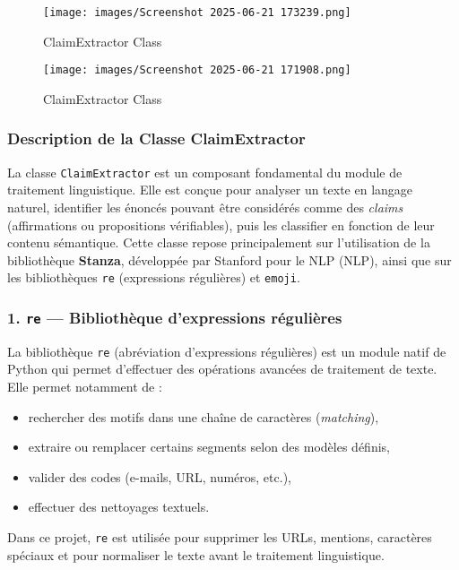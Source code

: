 \begin{description}
\begin{description}
\begin{description}
\begin{itemize}
\begin{figure}
\end{figure}

\begin{figure}
    \centering
    \texttt{[image: images/Screenshot 2025-06-21 173239.png]} 
    \caption{ClaimExtractor Class} %
    \label{fig:logos} %
\end{figure}
\newpage

\begin{figure}
  
    \texttt{[image: images/Screenshot 2025-06-21 171908.png]} 
    \caption{ClaimExtractor Class} %
    \label{fig:logos} %
\end{figure}
\vspace{-0.5cm}
\subsubsection{Description de la Classe ClaimExtractor}
La classe \texttt{ClaimExtractor} est un composant fondamental du module de traitement linguistique. Elle est conçue pour analyser un texte en langage naturel, identifier les énoncés pouvant être considérés comme des \textit{claims} (affirmations ou propositions vérifiables), puis les classifier en fonction de leur contenu sémantique. Cette classe repose principalement sur l'utilisation de la bibliothèque \textbf{Stanza}, développée par Stanford pour le NLP (NLP), ainsi que sur les bibliothèques \texttt{re} (expressions régulières) et \texttt{emoji}.

\subsubsection*{1. \texttt{re} --- Bibliothèque d'expressions régulières}
La bibliothèque \texttt{re} (abréviation d'expressions régulières) est un module natif de Python qui permet d'effectuer des opérations avancées de traitement de texte. Elle permet notamment de :
\begin{itemize}
    \item rechercher des motifs dans une chaîne de caractères (\textit{matching}),
    \item extraire ou remplacer certains segments selon des modèles définis,
    \item valider des codes (e-mails, URL, numéros, etc.),
    \item effectuer des nettoyages textuels.
\end{itemize}
Dans ce projet, \texttt{re} est utilisée pour supprimer les URLs, mentions, caractères spéciaux et pour normaliser le texte avant le traitement linguistique.


\end{itemize}
\end{description}
\end{description}
\end{description}
